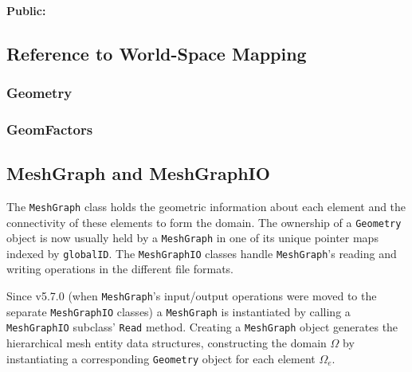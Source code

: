 \paragraph{Public:}



\subsection{Reference to World-Space Mapping}

\subsubsection{Geometry}


\subsubsection{GeomFactors}




\subsection{MeshGraph and MeshGraphIO}
The \verb+MeshGraph+ class holds the geometric information about each element and the connectivity of these elements to form the domain.
The ownership of a \verb+Geometry+ object is now usually held by a \verb+MeshGraph+ in one of its unique pointer maps indexed by \verb+globalID+.
The \verb+MeshGraphIO+ classes handle \verb+MeshGraph+'s reading and writing operations in the different file formats.

Since v5.7.0 (when \verb+MeshGraph+'s input/output operations were moved to the separate \verb+MeshGraphIO+ classes) a \verb+MeshGraph+ is instantiated by calling a \verb+MeshGraphIO+ subclass' \verb+Read+ method.
Creating a \verb+MeshGraph+ object generates the hierarchical mesh entity data structures, constructing the domain $\Omega$ by instantiating a corresponding \verb+Geometry+ object for each element $\Omega_e$.
